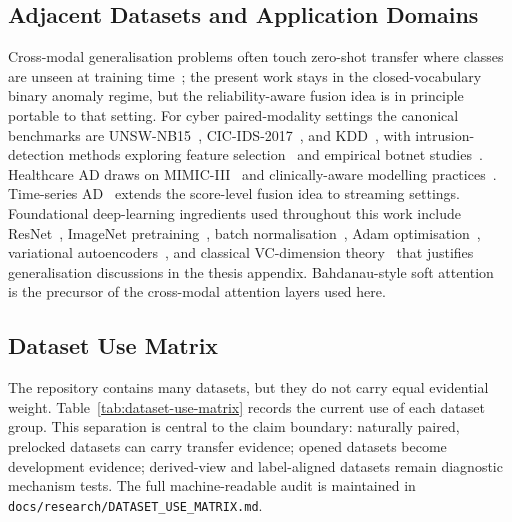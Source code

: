 \documentclass[10pt,conference]{IEEEtran}
\begin{document}
\subsection{Adjacent Datasets and Application Domains}
Cross-modal generalisation problems often touch zero-shot transfer where
classes are unseen at training time~\cite{wang2020deep}; the present work
stays in the closed-vocabulary binary anomaly regime, but the
reliability-aware fusion idea is in principle portable to that setting.
For cyber paired-modality settings the canonical benchmarks are
UNSW-NB15~\cite{moustafa2015unsw}, CIC-IDS-2017~\cite{sharafaldin2018cicids},
and KDD~\cite{kdd1999cup}, with intrusion-detection methods
exploring feature selection~\cite{kasongo2020performance,vinayakumar2019deep}
and empirical botnet studies~\cite{garcia2020cyber}. Healthcare AD draws
on MIMIC-III~\cite{johnson2016mimiciii} and clinically-aware modelling
practices~\cite{tonekaboni2019clinicians,rajkomar2018scalable}.
Time-series AD~\cite{schmidl2022anomaly,audibert2020usad,zhao2020multivariate}
extends the score-level fusion idea to streaming settings. Foundational
deep-learning ingredients used throughout this work include
ResNet~\cite{he2016deep},
ImageNet pretraining~\cite{krizhevsky2012imagenet},
batch normalisation~\cite{ioffe2015batch},
Adam optimisation~\cite{kingma2014adam},
variational autoencoders~\cite{kingma2014autoencoding}, and
classical VC-dimension theory~\cite{vapnik1971uniform} that justifies
generalisation discussions in the thesis appendix. Bahdanau-style
soft attention~\cite{bahdanau2014neural} is the precursor of the
cross-modal attention layers used here.

\subsection{Dataset Use Matrix}
The repository contains many datasets, but they do not carry equal evidential
weight. Table~\ref{tab:dataset-use-matrix} records the current use of each
dataset group. This separation is central to the claim boundary: naturally
paired, prelocked datasets can carry transfer evidence; opened datasets become
development evidence; derived-view and label-aligned datasets remain diagnostic
mechanism tests. The full machine-readable audit is maintained in
\texttt{docs/research/DATASET\_USE\_MATRIX.md}.

\begin{table}[t]
\centering
\caption{Dataset-use matrix. The table distinguishes official evidence,
development evidence, diagnostic datasets, and scaffolding data so that transfer
claims are not inferred from opened or derived-view results.}
\label{tab:dataset-use-matrix}
\scriptsize
{}
\end{table}
\end{document}
